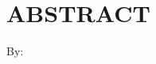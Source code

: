 \clearpage
\chapter*{ABSTRACT}

\begin{center}
    \center
    \begin{singlespace}
      \large\bfseries\MakeUppercase{}
  
      \normalfont\normalsize
      By:
  
      \bfseries \theauthor
    \end{singlespace}
\end{center} 


    
\clearpage

\clearpage